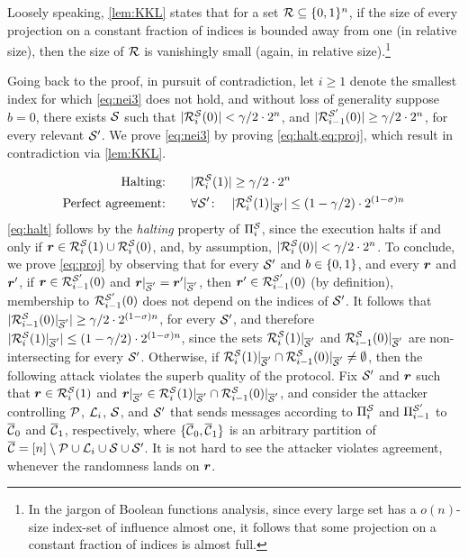 Loosely speaking, \cref{lem:KKL} states that for a set $\mathcal{R}\subseteq {\{0,1\}^n}$, if the size of every projection on a constant fraction of indices is bounded away from one (in relative size), then the size of $\mathcal{R}$ is vanishingly small
(again, in relative size).\footnote{In the jargon of Boolean functions analysis, since every large set has a $o(n)$-size index-set of influence almost one, it follows that some projection on a constant fraction of indices is almost full.}

Going back to the proof, in pursuit of contradiction, let $i\ge 1$ denote the smallest index for which \cref{eq:nei3} does not hold, and without loss of generality suppose $b=0$, \ie there exists $\mathcal{S}$ such that $|\mathcal{R}_{i}^{\mathcal{S}}(0)|< \gamma/2 \cdot 2^{n}$, and $|\mathcal{R}_{i-1}^{\mathcal{S}'}(0)|\ge \gamma/2 \cdot 2^n$, for every relevant $\mathcal{S}'$. We prove \cref{eq:nei3} by proving \cref{eq:halt,eq:proj}, which result in contradiction via \cref{lem:KKL}.

\begin{align}
\text{Halting:}&\qquad |\mathcal{R}_{i }^{\mathcal{S}}(1)|\ge \gamma/2 \cdot 2^{n} \label{eq:halt} \\
\text{Perfect agreement:}&\qquad \forall \mathcal{S}' \colon \quad |\mathcal{R}_{i}^{\mathcal{S}}(1)|_{\overline{\mathcal{S}}'}|\le (1-\gamma/2)\cdot 2^{(1-\sigma) n} \label{eq:proj}
\end{align}
\noindent
\cref{eq:halt} follows by the \emph{halting} property of $\Pi_{i}^{\mathcal{S}}$, since the execution halts if and only if ${ \boldsymbol{r}}\in \mathcal{R}_{i }^{\mathcal{S}}(1)\cup \mathcal{R}_{i }^{\mathcal{S}}(0)$, and, by assumption, $|\mathcal{R}_{i }^{\mathcal{S}}(0)|< \gamma/2 \cdot 2^{n}$. 
To conclude, we prove \cref{eq:proj} by observing that for every $\mathcal{S}'$ and $b\in \{0,1\}$, and every ${ \boldsymbol{r}}$ and ${ \boldsymbol{r}}'$, if ${ \boldsymbol{r}}\in \mathcal{R}_{i-1}^{\mathcal{S}'}(0)$ and ${ \boldsymbol{r}}|_{\overline{\mathcal{S}}'}={ \boldsymbol{r}}'|_{\overline{\mathcal{S}}'}$, then ${ \boldsymbol{r}}'\in \mathcal{R}_{i-1}^{\mathcal{S}'}(0)$ (by definition), \ie membership to $\mathcal{R}_{i-1}^{\mathcal{S}'}(0)$ does not depend on the indices of $\mathcal{S}'$. 
It follows that $|\mathcal{R}_{i-1}^{\mathcal{S}}(0)|_{\overline{\mathcal{S}}'}|\ge \gamma/2 \cdot 2^{(1-\sigma) n}$, for every $\mathcal{S}'$, and therefore $|\mathcal{R}_{i}^{\mathcal{S}}(1)|_{\overline{\mathcal{S}}'}|\le (1-\gamma/2)\cdot 2^{(1-\sigma) n}$, since the sets $\mathcal{R}_{i}^{\mathcal{S}}(1)|_{\overline{\mathcal{S}}'}$ and $\mathcal{R}_{i-1}^{\mathcal{S}}(0)|_{\overline{\mathcal{S}}'}$ are non-intersecting for every $\mathcal{S}'$. 
Otherwise, if $\mathcal{R}_{i}^{\mathcal{S}}(1)|_{\overline{\mathcal{S}}'}\cap \mathcal{R}_{i-1}^{\mathcal{S}}(0)|_{\overline{\mathcal{S}}'}\neq \emptyset$, then the following attack violates the superb quality of the protocol. Fix $\mathcal{S}'$ and ${ \boldsymbol{r}}$ such that ${ \boldsymbol{r}}\in \mathcal{R}_{i}^{\mathcal{S}}(1)$ and ${ \boldsymbol{r}}|_{\overline{\mathcal{S}}'}\in \mathcal{R}_{i}^{\mathcal{S}}(1)|_{\overline{\mathcal{S}}'}\cap \mathcal{R}_{i-1}^{\mathcal{S}}(0)|_{\overline{\mathcal{S}}'}$, and consider the attacker controlling $\mathcal{P}$, ${\cal{L}}_{i}$, $\mathcal{S}$, and $\mathcal{S}'$ that sends
messages according to $\Pi_{i}^{\mathcal{S}}$ and $\Pi_{i-1}^{\mathcal{S}'}$ to $\overline{\mathcal{C}}_0$ and $\overline{\mathcal{C}}_1$, respectively, where $\{\overline{\mathcal{C}}_0,\overline{\mathcal{C}}_1\}$ is an arbitrary partition of $\overline{\mathcal{C}}=[n]\setminus \mathcal{P}\cup {\cal{L}}_{i} \cup \mathcal{S}\cup \mathcal{S}'$. It is not hard to see the attacker violates agreement, whenever the randomness lands on ${ \boldsymbol{r}}$.



